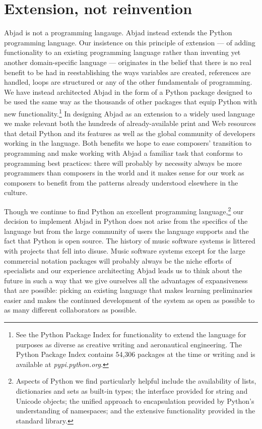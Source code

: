 \documentclass{article}
\begin{document}
\section{Extension, not reinvention} \label{sec:extension}

Abjad is not a programming langauge. Abjad instead extends the Python
programming language. Our insistence on this principle of extension --- of
adding functionality to an existing programming language rather than inventing
yet another domain-specific language --- originates in the belief that there is
no real benefit to be had in reestablishing the ways variables are created,
references are handled, loops are structured or any of the other fundamentals
of programming. We have instead architected Abjad in the form of a Python
package designed to be used the same way as the thousands of other packages
that equip Python with new functionality.\footnote{See the Python Package Index
for functionality to extend the language for purposes as diverse as creative
writing and aeronautical engineering. The Python Package Index contains 54,306
packages at the time or writing and is available at \textit{pypi.python.org}.}
In designing Abjad as an extension to a widely used language we make relevant
both the hundreds of already-available print and Web resources that detail
Python and its features as well as the global community of developers working
in the language. Both benefits we hope to ease composers' transition to
programming and make working with Abjad a familiar task that conforms to
programming best practices: there will probably by necessity always
be more programmers than composers in the world and it makes sense for our work
as composers to benefit from the patterns already understood elsewhere in the
culture.

Though we continue to find Python an excellent programming
language,\footnote{Aspects of Python we find particularly helpful include the
availability of lists, dictionaries and sets as built-in types; the interface
provided for string and Unicode objects; the unified approach to encapsulation
provided by Python's understanding of namespaces; and the extensive
functionality provided in the standard library.} our decision to implement
Abjad in Python does not arise from the specifics of the language but from the
large community of users the language supports and the fact that Python is open
source. The history of music software systems is littered with projects that
fell into disuse. Music software systems except for the large commercial
notation packages will probably always be the niche efforts of specialists and
our experience architecting Abjad leads us to think about the future in such a
way that we give ourselves all the advantages of expansiveness that are
possible: picking an existing language that makes learning preliminaries
easier and makes the continued development of the system as open as possible to
as many different collaborators as possible.
\end{document}
